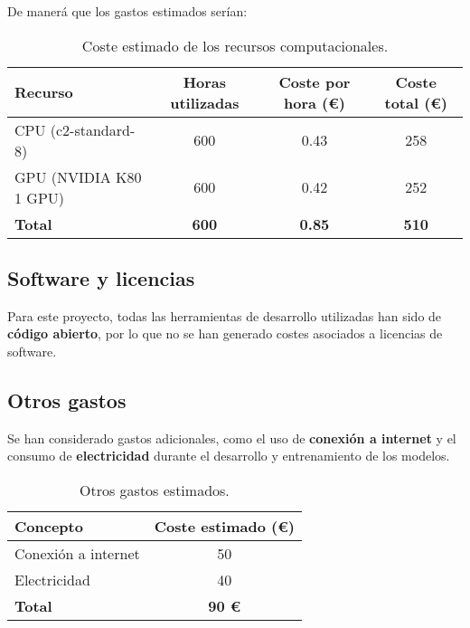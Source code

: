 De manerá que los gastos estimados serían:
\begin{table}[htp]\label{tab:recursos-computacionales}
    \centering
    \begin{adjustbox}{width=\linewidth}
        \begin{tabular}{|l|c|c|c|}
            \hline
            \textbf{Recurso} & \textbf{Horas utilizadas} & \textbf{Coste por hora (€)} &
            \textbf{Coste total (€)} \\ \hline
            CPU (c2-standard-8) & 600 & 0.43 & 258 \\
            GPU (NVIDIA K80 1 GPU) & 600 & 0.42 & 252 \\ \hline
            \textbf{Total} & \textbf{600} & \textbf{0.85} & \textbf{510} \\ \hline
        \end{tabular}
    \end{adjustbox}
    \caption{Coste estimado de los recursos computacionales.}
\end{table}


\subsection{Software y licencias}\label{subsec:software-y-licencias}
Para este proyecto, todas las herramientas de desarrollo utilizadas han sido de \textbf{código abierto}, por lo que no
se han generado costes asociados a licencias de software.

\subsection{Otros gastos}\label{subsec:otros-gastos}
Se han considerado gastos adicionales, como el uso de \textbf{conexión a internet} y el consumo de
\textbf{electricidad} durante el desarrollo y entrenamiento de los modelos.

\begin{table}[htp]\label{tab:otros-gastos}
    \centering
    \begin{tabular}{|l|c|}
        \hline
        \textbf{Concepto} & \textbf{Coste estimado (€)} \\ \hline
        Conexión a internet & 50 \\
        Electricidad & 40 \\ \hline
        \textbf{Total} & \textbf{90 €} \\ \hline
    \end{tabular}
    \caption{Otros gastos estimados.}
\end{table}


